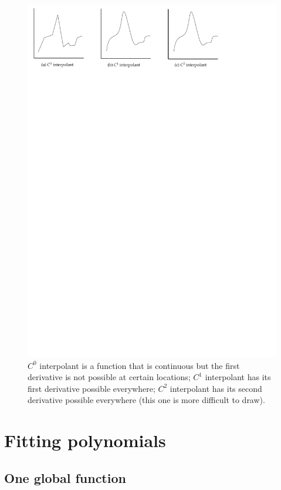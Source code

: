 \begin{figure}
  \centering
  \includegraphics[width=\linewidth]{figs/continuity}
  \caption{$C^0$ interpolant is a function that is continuous but the first derivative is not possible at certain locations; $C^1$ interpolant has its first derivative possible everywhere; $C^2$ interpolant has its second derivative possible everywhere (this one is more difficult to draw).}%
\end{figure}



\section{Fitting polynomials}


%
\subsection{One global function}


